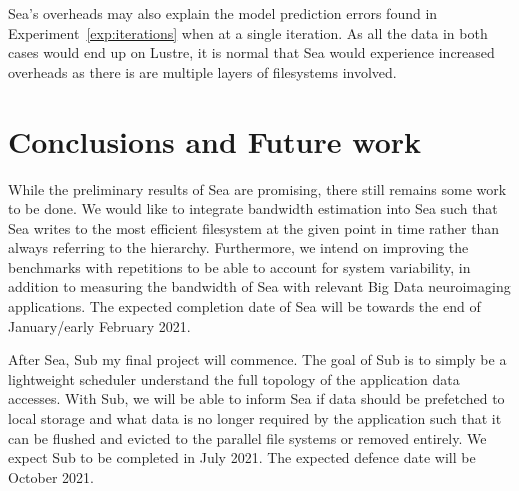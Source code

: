 \documentclass{report}
\begin{document}
    Sea's overheads may also explain the
    model prediction errors found in Experiment~\ref{exp:iterations} when at a single iteration.
    As all the data in both cases would end up on Lustre, it is normal that Sea would experience increased
    overheads as there is are multiple layers of filesystems involved.

    \chapter{Conclusions and Future work}\label{chp:conclusion}

    While the preliminary results of Sea are promising, there still remains some work
    to be done. We would like to integrate bandwidth estimation into Sea such that
    Sea writes to the most efficient filesystem at the given point in time rather
    than always referring to the hierarchy. Furthermore, we intend on improving the benchmarks with
    repetitions to be able to account for system variability, in addition to measuring
    the bandwidth of Sea with relevant Big Data neuroimaging applications. The expected
    completion date of Sea will be towards the end of January/early February 2021.

    After Sea, Sub my final project will commence. The goal of Sub is to simply be
    a lightweight scheduler understand the full topology of the application data accesses. With
    Sub, we will be able to inform Sea if data should be prefetched to local storage
    and what data is no longer required by the application such that it can be flushed 
    and evicted to the parallel file systems or removed entirely. We expect Sub to
    be completed in July 2021. The expected defence date will be October 2021.
    
        
        
\end{document}
